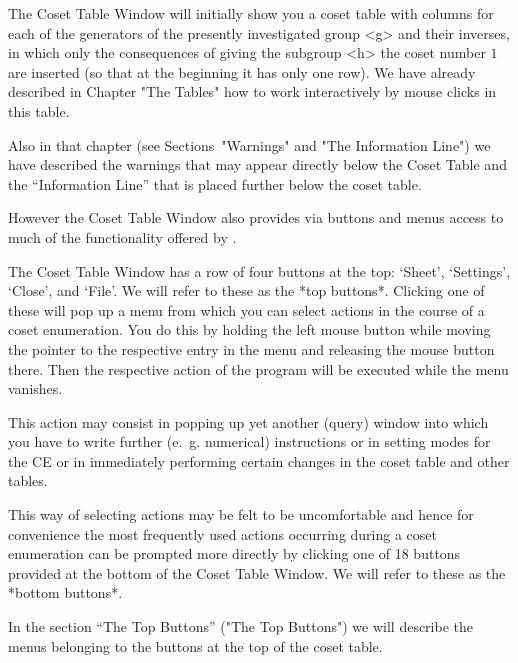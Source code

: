 



The Coset Table Window will initially show you a coset table with
columns for each of the generators of the presently investigated group
<g> and their inverses, in which only the consequences of giving the
subgroup <h> the coset number $1$ are inserted (so that at the
beginning it has only one row). We have already described in Chapter
"The Tables" how to work interactively by mouse clicks in this table.

Also in that chapter (see Sections~"Warnings" and "The Information
Line") we have described the warnings that may appear directly below
the Coset Table and the ``Information Line'' that is placed further
below the coset table.

However the Coset Table Window also provides via buttons and menus
access to much of the functionality offered by {\ITC}.

The Coset Table Window has a row of four buttons at the top: `Sheet',
`Settings', `Close', and `File'. We will refer to these as the *top
buttons*. Clicking one of these will pop up a menu from which you can
select actions in the course of a coset enumeration. You do this by
holding the left mouse button while moving the pointer to the
respective entry in the menu and releasing the mouse button there.
Then the respective action of the program will be executed while the
menu vanishes.

This action may consist in popping up yet another (query) window into
which you have to write further (e.~g. numerical) instructions or in
setting modes for the CE or in immediately performing certain changes
in the coset table and other tables.

This way of selecting actions may be felt to be uncomfortable and
hence for convenience the most frequently used actions occurring
during a coset enumeration can be prompted more directly by clicking
one of 18 buttons provided at the bottom of the Coset Table Window.
We will refer to these as the *bottom buttons*.

In the section ``The Top Buttons'' ("The Top Buttons") we will describe
the menus belonging to the buttons at the top of the coset table.

